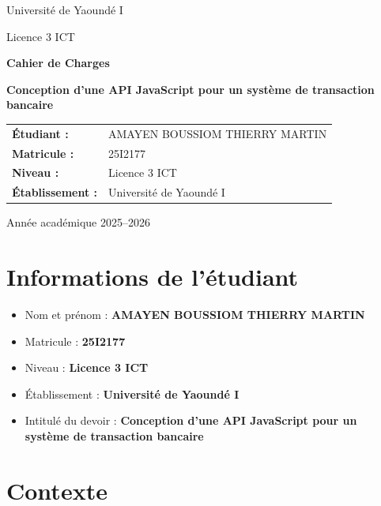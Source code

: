 \documentclass[12pt,a4paper]{article}
\begin{document}
\hypersetup{pageanchor=false}
\begin{titlepage}
    \centering
    {\Large Université de Yaoundé I \par}
    \vspace{0.5cm}
    {\large Licence 3 ICT \par}
    \vspace{2cm}
    {\LARGE \textbf{Cahier de Charges} \par}
    \vspace{0.5cm}
    {\Large \textbf{Conception d'une API JavaScript pour un système de transaction bancaire} \par}
    \vspace{2cm}
    \begin{tabular}{>{\bfseries}p{5cm}p{8cm}}
        Étudiant : & AMAYEN BOUSSIOM THIERRY MARTIN \\
        Matricule : & 25I2177 \\
        Niveau : & Licence 3 ICT \\
        Établissement : & Université de Yaoundé I \\
    \end{tabular}
    \vfill
    {\large Année académique 2025--2026 \par}
\end{titlepage}
\hypersetup{pageanchor=true}

\tableofcontents
\newpage

\section*{Informations de l'étudiant}

\begin{itemize}
    \item Nom et prénom : \textbf{AMAYEN BOUSSIOM THIERRY MARTIN}
    \item Matricule : \textbf{25I2177}
    \item Niveau : \textbf{Licence 3 ICT}
    \item Établissement : \textbf{Université de Yaoundé I}
    \item Intitulé du devoir : \textbf{Conception d'une API JavaScript pour un système de transaction bancaire}
\end{itemize}

\section{Contexte}
\end{document}
